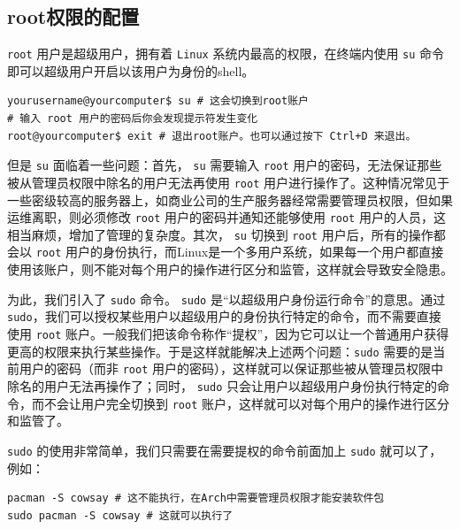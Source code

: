 \subsection{root权限的配置}

\verb|root| 用户是超级用户，拥有着 \verb|Linux| 系统内最高的权限，在终端内使用 \verb|su| 命令即可以超级用户开启以该用户为身份的shell。

\begin{verbatim}
yourusername@yourcomputer$ su # 这会切换到root账户
# 输入 root 用户的密码后你会发现提示符发生变化
root@yourcomputer$ exit # 退出root账户。也可以通过按下 Ctrl+D 来退出。
\end{verbatim}

但是 \verb|su| 面临着一些问题：首先， \verb|su| 需要输入 \verb|root| 用户的密码，无法保证那些被从管理员权限中除名的用户无法再使用 \verb|root| 用户进行操作了。这种情况常见于一些密级较高的服务器上，如商业公司的生产服务器经常需要管理员权限，但如果运维离职，则必须修改 \verb|root| 用户的密码并通知还能够使用 \verb|root| 用户的人员，这相当麻烦，增加了管理的复杂度。其次， \verb|su| 切换到 \verb|root| 用户后，所有的操作都会以 \verb|root| 用户的身份执行，而Linux是一个多用户系统，如果每一个用户都直接使用该账户，则不能对每个用户的操作进行区分和监管，这样就会导致安全隐患。

为此，我们引入了 \verb|sudo| 命令。 \verb|sudo| 是“以超级用户身份运行命令”的意思。通过 \verb|sudo|，我们可以授权某些用户以超级用户的身份执行特定的命令，而不需要直接使用 \verb|root| 账户。一般我们把该命令称作“提权”，因为它可以让一个普通用户获得更高的权限来执行某些操作。于是这样就能解决上述两个问题：\verb|sudo| 需要的是当前用户的密码（而非 \verb|root| 用户的密码），这样就可以保证那些被从管理员权限中除名的用户无法再操作了；同时， \verb|sudo| 只会让用户以超级用户身份执行特定的命令，而不会让用户完全切换到 \verb|root| 账户，这样就可以对每个用户的操作进行区分和监管了。

\verb|sudo| 的使用非常简单，我们只需要在需要提权的命令前面加上 \verb|sudo| 就可以了，例如：
\begin{verbatim}
pacman -S cowsay # 这不能执行，在Arch中需要管理员权限才能安装软件包
sudo pacman -S cowsay # 这就可以执行了
\end{verbatim}

